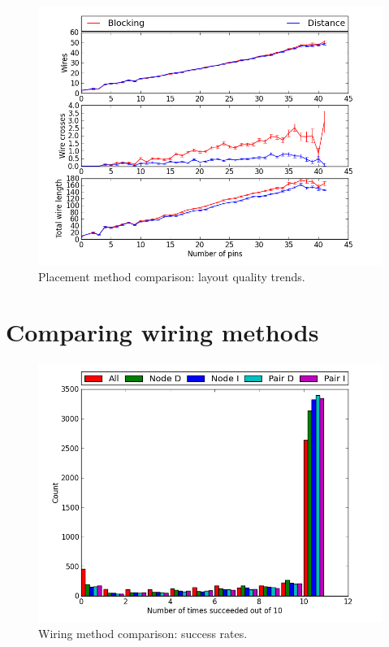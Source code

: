 \begin{figure}
\begin{center}
\includegraphics[width=\textwidth]{Images/placement_quality_trend_comparison.png}
\caption{Placement method comparison: layout quality trends.}
\label{fig:placement_quality_trend}
\end{center}
\end{figure}

\section{Comparing wiring methods}

\begin{figure}[H]
\begin{center}
\includegraphics[width=\textwidth]{Images/wiring_success_comparison.png}
\caption{Wiring method comparison: success rates.}
\label{fig:wiring_success}
\end{center}
\end{figure}

